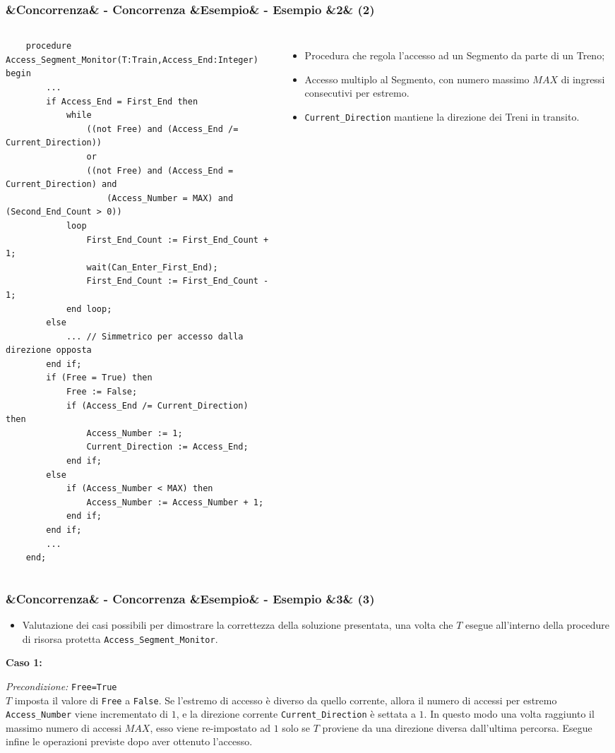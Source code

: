 \documentclass[slidestop,compress,blackandwhite]{beamer}
\newcommand{\ttt}[1]{\texttt{#1}}
\newcommand{\ii}[1]{\textit{#1}}
\newcommand{\describe}[2]{
	\textbf{#1}\\
	\begin{addmargin}[2em]{0em}
		#2
	\end{addmargin}
}
\newcommand{\newtitle}[4]{
	#1 
	\ifx&#2&%
	\else
  		\large- #2
	\fi
	\ifx&#3&%
	\else
  		\normalsize- #3
	\fi
	\ifx&#4&%
	\else
  		\normalsize (#4)
	\fi
}
\newcommand{\newframe}[5]{
	\begin{frame}
		\frametitle{\newtitle{#1}{#2}{#3}{#4}}
		#5
	\end{frame}
}
\newcommand{\myitemize}[1]{
	\begin{itemize}\itemsep4pt
	#1
	\end{itemize}
}
\begin{document}
	\begin{frame}[fragile]
	\frametitle{\newtitle{}{Concorrenza}{Esempio}{2}}
	\begin{columns}
	\vspace{-1.1cm}
	\tiny\begin{verbatim}
    procedure Access_Segment_Monitor(T:Train,Access_End:Integer) begin
        ...
        if Access_End = First_End then
            while 
                ((not Free) and (Access_End /= Current_Direction)) 
                or
                ((not Free) and (Access_End = Current_Direction) and 
                    (Access_Number = MAX) and (Second_End_Count > 0)) 
            loop
                First_End_Count := First_End_Count + 1;
                wait(Can_Enter_First_End);
                First_End_Count := First_End_Count - 1;
            end loop;
        else
            ... // Simmetrico per accesso dalla direzione opposta
        end if;
        if (Free = True) then
            Free := False;
            if (Access_End /= Current_Direction) then
                Access_Number := 1;
                Current_Direction := Access_End;
            end if;
        else
            if (Access_Number < MAX) then
                Access_Number := Access_Number + 1;
            end if;
        end if;
        ...
    end;
\end{verbatim}
		\footnotesize
		\myitemize{
			\item Procedura che regola l'accesso ad un Segmento da parte di un Treno;
			\item Accesso multiplo al Segmento, con numero massimo $MAX$ di ingressi consecutivi per estremo.
			\item \ttt{Current\_Direction} mantiene la direzione dei Treni in transito.
		}
	\end{columns}
	\end{frame}

	
	\newframe{}{Concorrenza}{Esempio}{3}{
		\footnotesize
		\justifying
		\myitemize {
			\item \justifying Valutazione dei casi possibili per dimostrare la correttezza della soluzione presentata, una volta che $T$ esegue all'interno della procedure di risorsa protetta \ttt{Access\_Segment\_Monitor}.
		}
		\describe{\footnotesize Caso 1:}{
			\footnotesize
			\justifying
			\ii{Precondizione:} \ttt{Free=True}\\
			$T$ imposta il valore di \ttt{Free} a \ttt{False}. Se l'estremo di accesso è diverso da quello corrente, allora il numero di accessi per estremo \ttt{Access\_Number} viene incrementato di $1$, e la direzione corrente \ttt{Current\_Direction} è settata a $1$. In questo modo una volta raggiunto il massimo numero di accessi $MAX$, esso viene re-impostato ad $1$ solo se $T$ proviene da una direzione diversa dall'ultima percorsa. Esegue infine le operazioni previste dopo aver ottenuto l'accesso.
		}
	}
	
\end{document}
